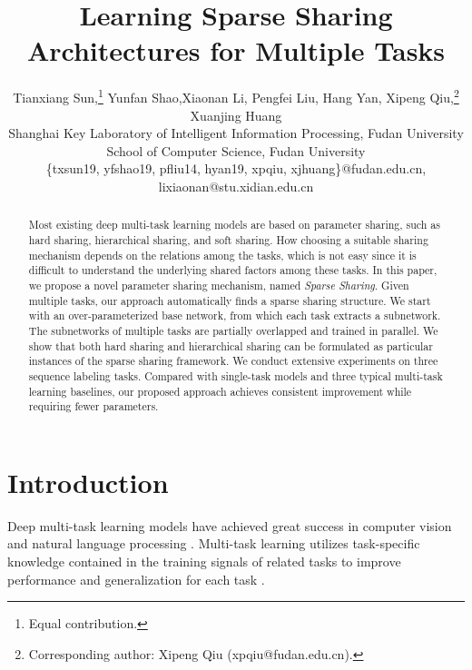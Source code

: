 \documentclass[letterpaper]{article} %
\title{Learning Sparse Sharing Architectures for Multiple Tasks}
\author{Tianxiang Sun,\thanks{Equal contribution.} Yunfan Shao,\footnotemark[1]  Xiaonan Li, Pengfei Liu, Hang Yan, Xipeng Qiu,\thanks{Corresponding author: Xipeng Qiu (xpqiu@fudan.edu.cn).} Xuanjing Huang\\
Shanghai Key Laboratory of Intelligent Information Processing, Fudan University\\
School of Computer Science, Fudan University\\
\{txsun19, yfshao19, pfliu14, hyan19, xpqiu, xjhuang\}@fudan.edu.cn, lixiaonan@stu.xidian.edu.cn %
}
\begin{document}
\maketitle

\begin{abstract}
Most existing deep multi-task learning models are based on parameter sharing, such as hard sharing, hierarchical sharing, and soft sharing. How choosing a suitable sharing mechanism depends on the relations among the tasks, which is not easy since it is difficult to understand the underlying shared factors among these tasks. In this paper, we propose a novel parameter sharing mechanism, named \emph{Sparse Sharing}. Given multiple tasks, our approach automatically finds a sparse sharing structure. We start with an over-parameterized base network, from which each task extracts a subnetwork. The subnetworks of multiple tasks are partially overlapped and trained in parallel. We show that both hard sharing and hierarchical sharing can be formulated as particular instances of the sparse sharing framework. We conduct extensive experiments on three sequence labeling tasks. Compared with single-task models and three typical multi-task learning baselines, our proposed approach achieves consistent improvement while requiring fewer parameters.
\end{abstract}


\section{Introduction}

\noindent Deep multi-task learning models have achieved great success in computer vision \cite{DBLP:conf/cvpr/MisraSGH16,DBLP:conf/cvpr/ZamirSSGMS18} and natural language processing \cite{DBLP:conf/icml/CollobertW08,DBLP:journals/corr/LuongLSVK15,DBLP:conf/acl/LiuQH17}. Multi-task learning utilizes task-specific knowledge contained in the training signals of related tasks to improve performance and generalization for each task \cite{DBLP:journals/ml/Caruana97}.
\end{document}
